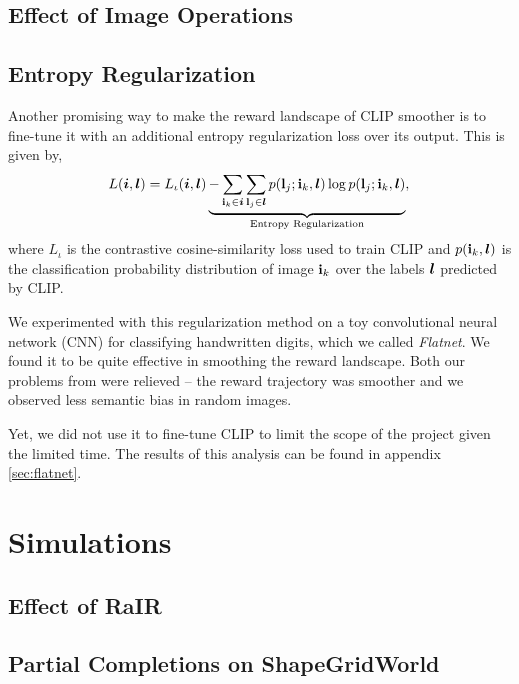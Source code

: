 \subsection{Effect of Image Operations}
\label{sec:image-operations}


\subsection{Entropy Regularization}
\label{sec:entropy-regularization}
Another promising way to make the reward landscape of CLIP smoother is to fine-tune it with an additional entropy regularization loss over its output.
This is given by,
\begin{equation}
    \label{eq:entropy-regularization}
    L(\bm{i}, \bm{l}) = L_{\iota}(\bm{i}, \bm{l}) \underbrace{- \sum_{\mathbf{i}_k \in \bm{i}}\sum_{\mathbf{l}_j \in \bm{l}} p(\mathbf{l}_j; \mathbf{i}_k, \bm{l}) \log p(\mathbf{l}_j; \mathbf{i}_k, \bm{l})}_{\text{Entropy Regularization}},\\
\end{equation}
where \(L_{\iota}\) is the contrastive cosine-similarity loss used to train CLIP and \(p(\mathbf{i}_k, \bm{l})\) is the classification probability distribution of image \(\mathbf{i}_k\) over the labels \(\bm{l}\) predicted by CLIP.

We experimented with this regularization method on a toy convolutional neural network (CNN) for classifying handwritten digits, which we called \emph{Flatnet}.
We found it to be quite effective in smoothing the reward landscape.
Both our problems from  were relieved -- the reward trajectory was smoother and we observed less semantic bias in random images.

Yet, we did not use it to fine-tune CLIP to limit the scope of the project given the limited time.
The results of this analysis can be found in appendix \ref{sec:flatnet}.

\newpage
\section{Simulations}
\label{sec:simulations}


\subsection{Effect of RaIR}
\label{sec:effect-rair}


\subsection{Partial Completions on ShapeGridWorld}
\label{sec:partial-completion}
